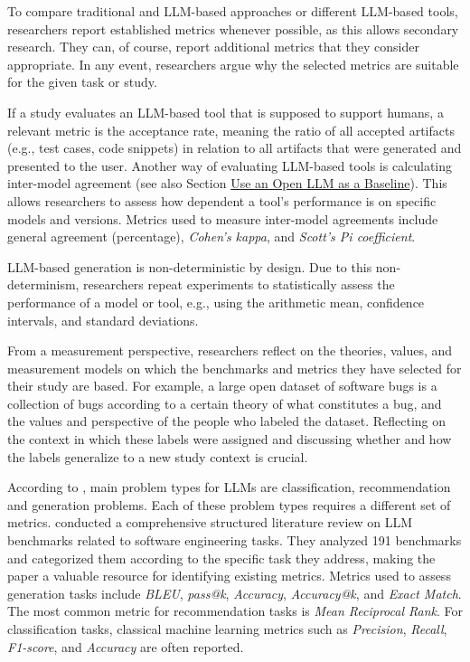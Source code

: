 To compare traditional and LLM-based approaches or different LLM-based tools, researchers \should report established metrics whenever possible, as this allows secondary research.
They can, of course, report additional metrics that they consider appropriate.
In any event, researchers \must argue why the selected metrics are suitable for the given task or study. 

If a study evaluates an LLM-based tool that is supposed to support humans, a relevant metric is the acceptance rate, meaning the ratio of all accepted artifacts (e.g., test cases, code snippets) in relation to all artifacts that were generated and presented to the user.
Another way of evaluating LLM-based tools is calculating inter-model agreement (see also Section \href{/guidelines/#use-an-open-llm-as-a-baseline}{Use an Open LLM as a Baseline}).
This allows researchers to assess how dependent a tool's performance is on specific models and versions.
Metrics used to measure inter-model agreements include general agreement (percentage), \emph{Cohen's kappa}, and \emph{Scott's Pi coefficient}.

LLM-based generation is non-deterministic by design.
Due to this non-determinism, researchers \should repeat experiments to statistically assess the performance of a model or tool, e.g., using the arithmetic mean, confidence intervals, and standard deviations.

From a measurement perspective, researchers \should reflect on the theories, values, and measurement models on which the benchmarks and metrics they have selected for their study are based.
For example, a large open dataset of software bugs is a collection of bugs according to a certain theory of what constitutes a bug, and the values and perspective of the people who labeled the dataset.
Reflecting on the context in which these labels were assigned and discussing whether and how the labels generalize to a new study context is crucial.


According to \citeauthor{10.1145/3695988}, main problem types for LLMs are classification, recommendation and generation problems.
Each of these problem types requires a different set of metrics.
\citeauthor{hu2025assessingadvancingbenchmarksevaluating} conducted a comprehensive structured literature review on LLM benchmarks related to software engineering tasks.
They analyzed 191 benchmarks and categorized them according to the specific task they address, making the paper a valuable resource for identifying existing metrics. 
Metrics used to assess generation tasks include \emph{BLEU}, \emph{pass@k}, \emph{Accuracy}, \emph{Accuracy@k}, and \emph{Exact Match}.
The most common metric for recommendation tasks is \emph{Mean Reciprocal Rank}.
For classification tasks, classical machine learning metrics such as \emph{Precision}, \emph{Recall}, \emph{F1-score}, and \emph{Accuracy} are often reported.

